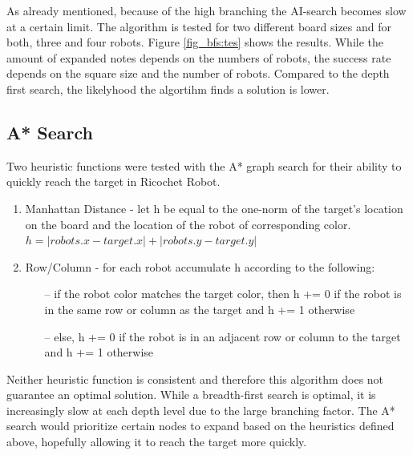 \documentclass[a4paper,10pt]{article}
\begin{document}
  As already mentioned, because of the high branching the AI-search becomes slow at a certain limit. The algorithm is tested for two different board sizes and for both, three and four robots. Figure \ref{fig_bfs:tes} shows the results. While the amount of expanded notes depends on the numbers of robots, the success rate depends on the square size and the number of robots. Compared to the depth first search, the likelyhood the algortihm finds a solution is lower.

  \subsection{A* Search}
  Two heuristic functions were tested with the A* graph search for their ability to quickly reach the target in Ricochet Robot.
  \begin{enumerate}
    \item Manhattan Distance - let h be equal to the one-norm of the target's location on the board and the location of the robot of corresponding color. \\
    $h = |robots.x - target.x| + |robots.y - target.y|$
    \item Row/Column - for each robot accumulate h according to the following:
    \begin{itemize}
      \item[--] if the robot color matches the target color, then h += 0 if the robot is in the same row or column as the target and h += 1 otherwise
      \item[--] else, h += 0 if the robot is in an adjacent row or column to the target and h += 1 otherwise
    \end{itemize}
  \end{enumerate}
  Neither heuristic function is consistent and therefore this algorithm does not guarantee an optimal solution.  While a breadth-first search is optimal,
  it is increasingly slow at each depth level due to the large branching factor.  The A* search would prioritize certain nodes to expand based on the heuristics
  defined above, hopefully allowing it to reach the target more quickly. \\
\end{document}
